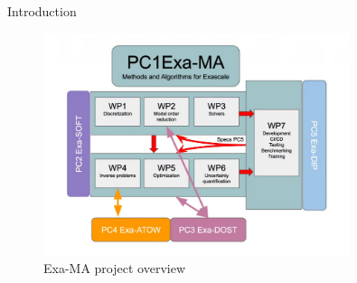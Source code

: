 \documentclass[10pt]{beamer}
\begin{document}
\begin{frame}{Introduction}
	\begin{figure}
		\centering
		\includegraphics[width=0.8\textwidth]{images/exama_overview.png}
		\caption{Exa-MA project overview \cite{numpex}}
		\label{fig:figure1}
	\end{figure}
\end{frame}
\end{document}
